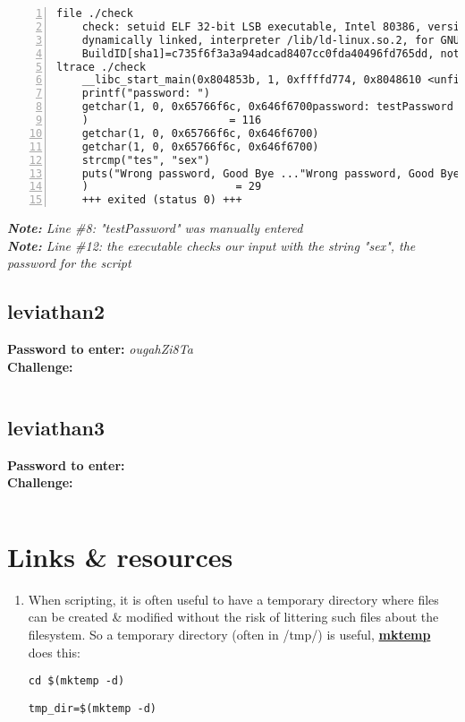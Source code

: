 \documentclass[a4paper]{article}
\newcommand{\pass}[1]{\textbf{Password to enter:} \textit{#1}\\}
\newcommand{\chall}{\textbf{Challenge:} }
\newcommand{\note}[1]{\textit{\textbf{Note:} #1}\\}
\begin{document}
\begin{lstlisting}[title=the shell during reversal, numbers=left, deletekeywords={printf}]
file ./check
	check: setuid ELF 32-bit LSB executable, Intel 80386, version 1 (SYSV),
	dynamically linked, interpreter /lib/ld-linux.so.2, for GNU/Linux 2.6.32,
	BuildID[sha1]=c735f6f3a3a94adcad8407cc0fda40496fd765dd, not stripped
ltrace ./check
	__libc_start_main(0x804853b, 1, 0xffffd774, 0x8048610 <unfinished ...>
	printf("password: ")                                       = 10
	getchar(1, 0, 0x65766f6c, 0x646f6700password: testPassword
	)                      = 116
	getchar(1, 0, 0x65766f6c, 0x646f6700)                      = 101
	getchar(1, 0, 0x65766f6c, 0x646f6700)                      = 115
	strcmp("tes", "sex")                                       = 1
	puts("Wrong password, Good Bye ..."Wrong password, Good Bye ...
	)                       = 29
	+++ exited (status 0) +++
\end{lstlisting}
\note{Line \#8: "testPassword" was manually entered}
\note{Line \#12: the executable checks our input with the string "sex", the password for the script}

\subsection*{leviathan2}
\pass{ougahZi8Ta}
\chall
\begin{lstlisting}
\end{lstlisting}

\subsection*{leviathan3}
\pass{}
\chall
\begin{lstlisting}
\end{lstlisting}

\section*{Links \& resources}
\begin{enumerate}

\item When scripting, it is often useful to have a temporary directory where files can be created \& modified without the risk of littering such files about the filesystem. So a temporary directory (often in /tmp/) is useful, \href{https://code-maven.com/create-temporary-directory-on-linux-using-bash}{\textbf{mktemp}} does this:
	\begin{lstlisting}[title=move to the new temporary directory]
	cd $(mktemp -d)
	\end{lstlisting}
	\begin{lstlisting}[title=store the new temporary directory path]
	tmp_dir=$(mktemp -d)
	\end{lstlisting}
\end{enumerate}
\end{document}
